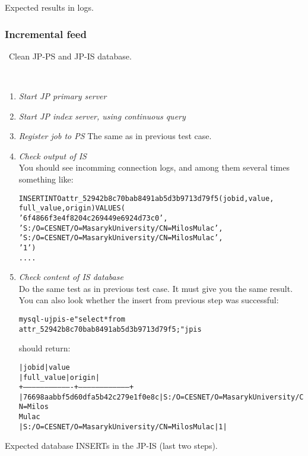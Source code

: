 \result{} Expected results in logs.


\subsubsection{Incremental feed}

\req\ Clean JP-PS and JP-IS database.

\how\
\begin{enumerate}
 \item \emph{Start JP primary server}
 \item \emph{Start JP index server, using continuous query}
 \item \emph{Register job to PS}
  The same as in previous test case.

 \item \emph{Check output of IS}\\
  You should see incomming connection logs, and among them
  several times something like:
  \begin{alltt}
    
   INSERT INTO attr_52942b8c70bab8491ab5d3b9713d79f5 (jobid, value,
                                        full_value, origin) VALUES (
     '6f4866f3e4f8204c269449e6924d73c0',
     'S:/O=CESNET/O=Masaryk University/CN=Milos Mulac',
     'S:/O=CESNET/O=Masaryk University/CN=Milos Mulac',
     '1')
   ....
  \end{alltt}
 \item \emph{Check content of IS database}\\
 Do the same test as in previous test case. It must give you the same
 result. You can also look whether the insert from previous step was 
 successful:
 \begin{alltt}
  mysql -u jpis -e "select * from
    attr_52942b8c70bab8491ab5d3b9713d79f5;" jpis
 \end{alltt}
  should return:
 \begin{alltt}
| jobid                            | value
| full_value                                      | origin |
+----------------------------------+-----------------------------------+
| 76698aabbf5d60dfa5b42c279e1f0e8c | S:/O=CESNET/O=Masaryk University/CN=Milos
Mulac 
| S:/O=CESNET/O=Masaryk University/CN=Milos Mulac |      1 |
 \end{alltt}
\end{enumerate}
\result{} Expected database INSERTs in the JP-IS (last two steps).

